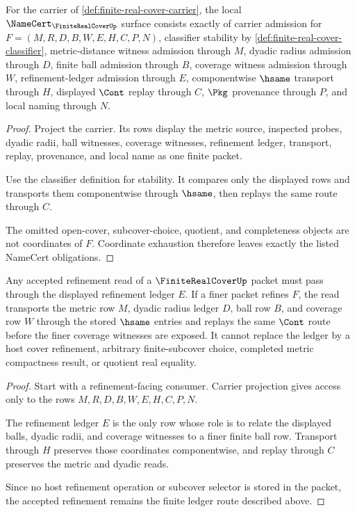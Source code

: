 \begin{theorem}
\label{thm:finite-real-cover-namecert-obligations}
For the carrier of \autoref{def:finite-real-cover-carrier}, the local $\NameCert_{\FiniteRealCoverUp}$ surface consists exactly of carrier admission for $F=(M,R,D,B,W,E,H,C,P,N)$, classifier stability by \autoref{def:finite-real-cover-classifier}, metric-distance witness admission through $M$, dyadic radius admission through $D$, finite ball admission through $B$, coverage witness admission through $W$, refinement-ledger admission through $E$, componentwise $\hsame$ transport through $H$, displayed $\Cont$ replay through $C$, $\Pkg$ provenance through $P$, and local naming through $N$.
\end{theorem}
\begin{proof}
Project the carrier. Its rows display the metric source, inspected probes, dyadic radii, ball witnesses, coverage witnesses, refinement ledger, transport, replay, provenance, and local name as one finite packet.

Use the classifier definition for stability. It compares only the displayed rows and transports them componentwise through $\hsame$, then replays the same route through $C$.

The omitted open-cover, subcover-choice, quotient, and completeness objects are not coordinates of $F$. Coordinate exhaustion therefore leaves exactly the listed NameCert obligations.
\end{proof}

\begin{theorem}
\label{thm:finite-real-cover-refinement-stability}
Any accepted refinement read of a $\FiniteRealCoverUp$ packet must pass through the displayed refinement ledger $E$. If a finer packet refines $F$, the read transports the metric row $M$, dyadic radius ledger $D$, ball row $B$, and coverage row $W$ through the stored $\hsame$ entries and replays the same $\Cont$ route before the finer coverage witnesses are exposed. It cannot replace the ledger by a host cover refinement, arbitrary finite-subcover choice, completed metric compactness result, or quotient real equality.
\end{theorem}
\begin{proof}
Start with a refinement-facing consumer. Carrier projection gives access only to the rows $M,R,D,B,W,E,H,C,P,N$.

The refinement ledger $E$ is the only row whose role is to relate the displayed balls, dyadic radii, and coverage witnesses to a finer finite ball row. Transport through $H$ preserves those coordinates componentwise, and replay through $C$ preserves the metric and dyadic reads.

Since no host refinement operation or subcover selector is stored in the packet, the accepted refinement remains the finite ledger route described above.
\end{proof}

